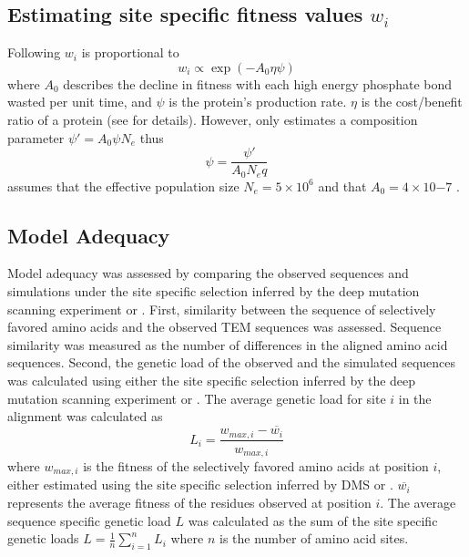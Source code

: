 \subsection{Estimating site specific fitness values $w_i$}

Following \citet{beaulieu2018} $w_i$ is proportional to
\begin{equation}
w_i \propto \exp(-A_0\eta\psi)
\end{equation}
where $A_0$ describes the decline in fitness with each high energy phosphate bond wasted per unit time, and $\psi$ is the protein's production rate.
$\eta$ is the cost/benefit ratio of a protein (see \citep{beaulieu2018} for details). 
However, \selac only estimates a composition parameter $\psi' = A_0\psi N_e$ thus
\begin{equation}
\psi = \frac{\psi'}{A_0N_eq}
\end{equation}
\selac assumes that the effective population size $N_e = 5\times 10^6$ and that $A_0 = 4 \times 10{-7}$ \citep{gilchrist2007}.

\subsection{Model Adequacy}

Model adequacy was assessed by comparing the observed sequences and simulations under the site specific selection inferred by the deep mutation scanning experiment or \selac.
First, similarity between the sequence of selectively favored amino acids and the observed TEM sequences was assessed.
Sequence similarity was measured as the number of differences in the aligned amino acid sequences.
Second, the genetic load of the observed and the simulated sequences was calculated using either the site specific selection inferred by the deep mutation scanning experiment or \selac.
The average genetic load for site $i$ in the alignment was calculated as
\begin{equation}
L_i = \frac{w_{max,i} - \overline{w_i}}{w_{max,i}}
\end{equation}
where $w_{max,i}$ is the fitness of the selectively favored amino acids at position $i$, either estimated using the site specific selection inferred by DMS or \selac.
$\overline{w_i}$ represents the average fitness of the residues observed at position $i$.
The average sequence specific genetic load $L$ was calculated as the sum of the site specific genetic loads $L = \frac{1}{n}\sum_{i=1}^n L_i$ where $n$ is the number of amino acid sites.

